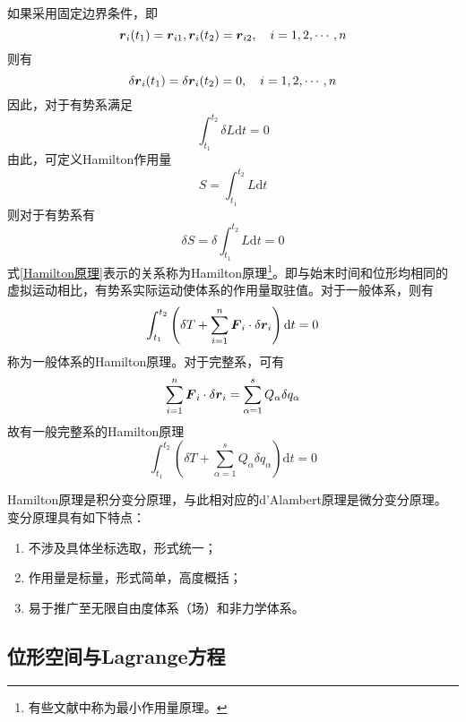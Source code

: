 如果采用固定边界条件，即
\begin{equation*}
	\boldsymbol{r}_i(t_1) = \boldsymbol{r}_{i1},\boldsymbol{r}_i(t_2) = \boldsymbol{r}_{i2},\quad i=1,2,\cdots,n
\end{equation*}
则有
\begin{equation*}
	\delta \boldsymbol{r}_i(t_1) = \delta \boldsymbol{r}_i(t_2) = 0,\quad i = 1,2,\cdots,n
\end{equation*}
因此，对于有势系满足
\begin{equation*}
	\int_{t_1}^{t_2} \delta L \mathrm{d} t = 0
\end{equation*}
由此，可定义{\heiti Hamilton作用量}
\begin{equation}
	S = \int_{t_1}^{t_2} L \mathrm{d} t
	\label{Hamilton作用量}
\end{equation}
则对于有势系有
\begin{equation}
	\delta S = \delta\int_{t_1}^{t_2} L \mathrm{d} t = 0
	\label{Hamilton原理}
\end{equation}
式\eqref{Hamilton原理}表示的关系称为{\heiti Hamilton原理}\footnote{有些文献中称为{\heiti 最小作用量原理}。}。即与始末时间和位形均相同的虚拟运动相比，有势系实际运动使体系的作用量取驻值。对于一般体系，则有
\begin{equation}
	\int_{t_1}^{t_2} \left(\delta T + \sum_{i=1}^n \boldsymbol{F}_i \cdot \delta \boldsymbol{r}_i\right) \mathrm{d} t = 0
	\label{一般体系的Hamilton原理}
\end{equation}
称为{\heiti 一般体系的Hamilton原理}。对于完整系，可有
\begin{equation*}
	\sum_{i=1}^n \boldsymbol{F}_i \cdot \delta \boldsymbol{r}_i = \sum_{\alpha=1}^s Q_\alpha \delta q_\alpha
\end{equation*}
故有{\heiti 一般完整系的Hamilton原理}
\begin{equation}
	\int_{t_1}^{t_2} \left(\delta T + \sum_{\alpha=1}^s Q_\alpha \delta q_\alpha\right) \mathrm{d} t = 0
	\label{一般完整系的Hamilton原理}
\end{equation}

Hamilton原理是积分变分原理，与此相对应的d'Alambert原理是微分变分原理。变分原理具有如下特点：
\begin{enumerate}
	\item 不涉及具体坐标选取，形式统一；
	\item 作用量是标量，形式简单，高度概括；
	\item 易于推广至无限自由度体系（场）和非力学体系。
\end{enumerate}

\subsection{位形空间与Lagrange方程}

